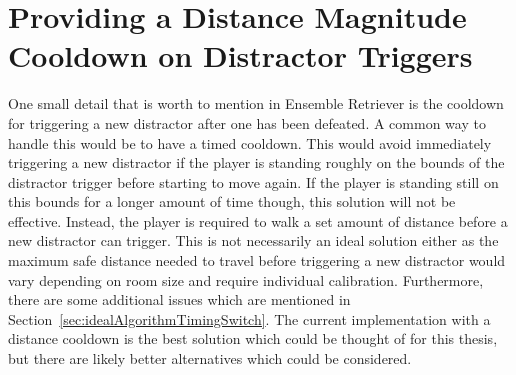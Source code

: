 \section{Providing a Distance Magnitude Cooldown on Distractor Triggers}
One small detail that is worth to mention in Ensemble Retriever is the cooldown for triggering a new distractor after one has been defeated. A common way to handle this would be to have a timed cooldown. This would avoid immediately triggering a new distractor if the player is standing roughly on the bounds of the distractor trigger before starting to move again. If the player is standing still on this bounds for a longer amount of time though, this solution will not be effective. Instead, the player is required to walk a set amount of distance before a new distractor can trigger. This is not necessarily an ideal solution either as the maximum safe distance needed to travel before triggering a new distractor would vary depending on room size and require individual calibration. Furthermore, there are some additional issues which are mentioned in Section~\ref{sec:idealAlgorithmTimingSwitch}. The current implementation with a distance cooldown is the best solution which could be thought of for this thesis, but there are likely better alternatives which could be considered. 